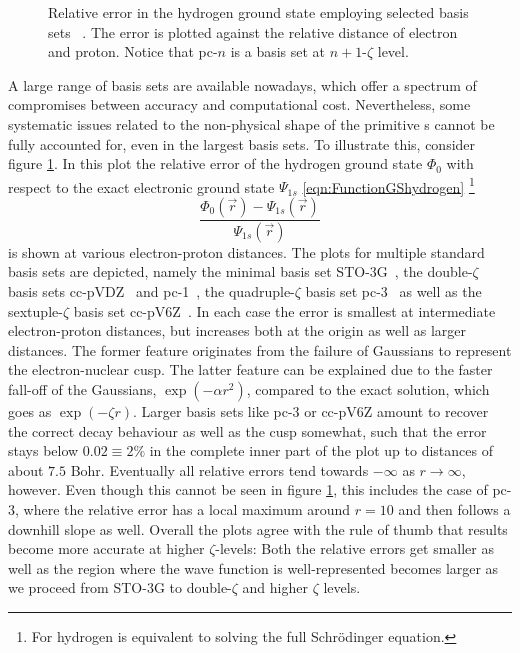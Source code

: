 \begin{figure}
	\centering
	\caption[Relative error in the hydrogen ground state
		for selected \cGTO bases]
	{Relative error in the hydrogen ground state
		employing selected \cGTO basis sets~%
		\cite{Hehre1969,Dunning1989,Jensen2001,Wilson1996}.
		The error is plotted against
		the relative distance of electron and proton.
		Notice that pc-$n$ is a basis set at $n+1$-$\zeta$ level.
	}
	\label{fig:RelativeErrorCgto}
\end{figure}
A large range of \cGTO basis sets are available nowadays,
which offer a spectrum of compromises between accuracy and computational cost.
Nevertheless, some systematic issues related to the non-physical shape
of the primitive {\GTO}s cannot be fully accounted for,
even in the largest basis sets.
To illustrate this, consider figure \ref{fig:RelativeErrorCgto}.
In this plot the
relative error of the hydrogen ground state $\Phi_0$
with respect to the exact
electronic ground state $\Psi_{1s}$ \eqref{eqn:FunctionGShydrogen}%
\footnote{For hydrogen \HF is equivalent to solving the full Schrödinger equation.}
\[ \frac{\Phi_0(\vec{r}) - \Psi_{1s}(\vec{r})}{\Psi_{1s}(\vec{r})} \]
is shown at various electron-proton distances.
The plots for multiple standard \cGTO basis sets are depicted,
namely the minimal basis set STO-3G~\cite{Hehre1969},
the double-$\zeta$ basis sets cc-pVDZ~\cite{Dunning1989}
and pc-1~\cite{Jensen2001},
the quadruple-$\zeta$ basis set pc-3~\cite{Jensen2001}
as well as the sextuple-$\zeta$ basis set cc-pV6Z~\cite{Wilson1996}.
In each case the error is smallest at intermediate
electron-proton distances, but increases both at the origin
as well as larger distances.
The former feature originates from the failure of Gaussians
to represent the electron-nuclear cusp.
The latter feature can be explained due to the faster fall-off
of the Gaussians, $\exp(-\alpha r^2)$,
compared to the exact solution,
which goes as $\exp(-\zeta r)$.
Larger basis sets like pc-3 or cc-pV6Z amount to recover the
correct decay behaviour as well as the cusp somewhat,
such that the error stays below $0.02 \equiv 2\%$
in the complete inner part of the plot up to distances
of about $7.5$ Bohr.
Eventually all relative errors tend towards $-\infty$ as $r \to \infty$,
however.
Even though this cannot be seen in figure \ref{fig:RelativeErrorCgto},
this includes the case of pc-3,
where the relative error has a local maximum around $r = 10$
and then follows a downhill slope as well.
Overall the plots agree with the rule of thumb
that results become more accurate at higher $\zeta$-levels:
Both the relative errors get smaller as well as the region
where the wave function is well-represented becomes larger
as we proceed from STO-3G to double-$\zeta$ and higher $\zeta$ levels.

